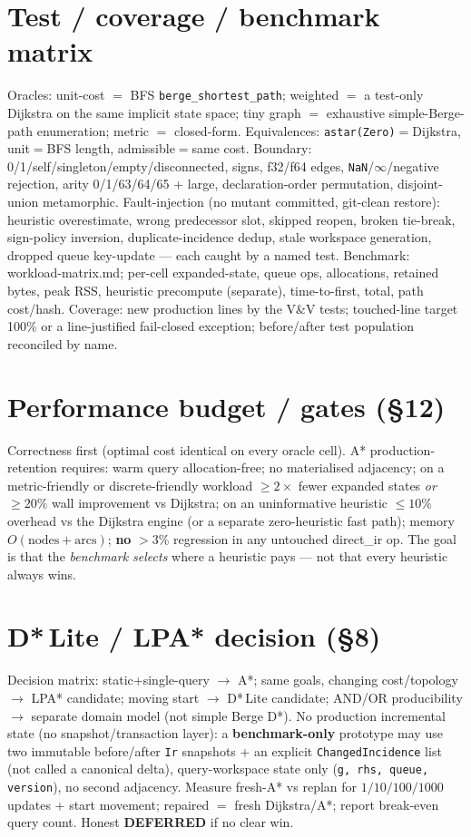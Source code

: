 \documentclass[11pt]{article}
\begin{document}
\section*{Test / coverage / benchmark matrix}
Oracles: unit-cost $=$ BFS \texttt{berge\_shortest\_path}; weighted $=$ a test-only Dijkstra on the same
implicit state space; tiny graph $=$ exhaustive simple-Berge-path enumeration; metric $=$ closed-form.
Equivalences: \texttt{astar(Zero)}$=$Dijkstra, unit$=$BFS length, admissible$=$same cost. Boundary:
0/1/self/singleton/empty/disconnected, signs, f32/f64 edges, \texttt{NaN}/$\infty$/negative rejection,
arity 0/1/63/64/65 + large, declaration-order permutation, disjoint-union metamorphic. Fault-injection
(no mutant committed, git-clean restore): heuristic overestimate, wrong predecessor slot, skipped reopen,
broken tie-break, sign-policy inversion, duplicate-incidence dedup, stale workspace generation, dropped
queue key-update --- each caught by a named test. Benchmark: workload-matrix.md; per-cell expanded-state,
queue ops, allocations, retained bytes, peak RSS, heuristic precompute (separate), time-to-first, total,
path cost/hash. Coverage: new production lines by the V\&V tests; touched-line target 100\% or a
line-justified fail-closed exception; before/after test population reconciled by name.

\section*{Performance budget / gates (§12)}
Correctness first (optimal cost identical on every oracle cell). A* production-retention requires: warm
query allocation-free; no materialised adjacency; on a metric-friendly or discrete-friendly workload
$\ge 2\times$ fewer expanded states \emph{or} $\ge 20\%$ wall improvement vs Dijkstra; on an uninformative
heuristic $\le 10\%$ overhead vs the Dijkstra engine (or a separate zero-heuristic fast path); memory
$O(\text{nodes}+\text{arcs})$; \textbf{no} $>3\%$ regression in any untouched direct\_ir op. The goal is that
the \emph{benchmark selects} where a heuristic pays --- not that every heuristic always wins.

\section*{D*\,Lite / LPA* decision (§8)}
Decision matrix: static+single-query $\to$ A*; same goals, changing cost/topology $\to$ LPA* candidate;
moving start $\to$ D*\,Lite candidate; AND/OR producibility $\to$ separate domain model (not simple Berge
D*). No production incremental state (no snapshot/transaction layer): a \textbf{benchmark-only} prototype may
use two immutable before/after \texttt{Ir} snapshots + an explicit \texttt{ChangedIncidence} list (not called
a canonical delta), query-workspace state only (\texttt{g, rhs, queue, version}), no second adjacency.
Measure fresh-A* vs replan for $1/10/100/1000$ updates + start movement; repaired $=$ fresh Dijkstra/A*;
report break-even query count. Honest \textbf{DEFERRED} if no clear win.
\end{document}
